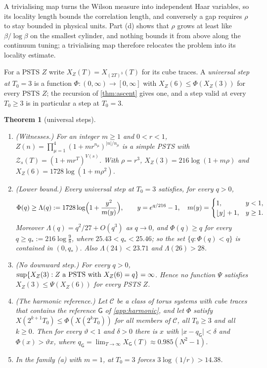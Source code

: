 \documentclass[11pt,a4paper]{amsart}
\newtheorem{theorem}{Theorem}[section]
\theoremstyle{definition}
\theoremstyle{remark}
\numberwithin{equation}{section}
\newcommand{\abs}[1]{\lvert #1\rvert}      %
\newcommand{\PSTS}{\textup{PSTS}}          %
\newcommand{\TT}{\mathbb{T}}               %
\newcommand{\Zc}{\mathcal{Z}}              %
\newcommand{\Zs}[2]{\Zc_{#1}(#2)}          %
\newcommand{\XT}[2]{X_{#1}(#2)}            %
\newcommand{\Vol}[1]{V(#1)}                %
\newcommand{\cube}[1]{(2#1)^3}             %
\newcommand{\Gharm}{\mathsf{G}}            %
\newcommand{\Bcirc}{\text{\upshape(B$^{\circ}$)}}   %
\begin{document}
A trivialising map turns the Wilson measure into independent Haar variables, so its locality length bounds the correlation length, and conversely a gap requires $\rho$ to stay bounded in physical units. Part (d) shows that $\rho$ grows at least like $\beta/\log\beta$ on the smallest cylinder, and nothing bounds it from above along the continuum tuning; a trivialising map therefore relocates the problem into its locality estimate.

For a \PSTS{} $Z$ write $X_Z(T)=\XT{\cube T}{T}$ for its cube traces. A \emph{universal step at $T_0=3$} is a function $\Phi\colon(0,\infty)\to[0,\infty]$ with $X_Z(6)\le\Phi(X_Z(3))$ for every \PSTS{} $Z$; the recursion of \cref{thm:ascent} gives one, and a step valid at every $T_0\ge3$ is in particular a step at $T_0=3$.

\begin{theorem}[universal steps]\label{thm:universal-step}
\begin{enumerate}[label=\textup{(\alph*)},leftmargin=*]
\item \textup{(Witnesses.)} For an integer $m\ge1$ and $0<r<1$, $Z(n)=\prod_{\mu=1}^4(1+mr^{n_\mu})^{\abs n/n_\mu}$ is a simple \PSTS{} with $\Zs sT=(1+mr^T)^{\Vol s}$. With $\rho=r^3$, $X_Z(3)=216\log(1+m\rho)$ and $X_Z(6)=1728\log(1+m\rho^2)$.
\item \textup{(Lower bound.)} Every universal step at $T_0=3$ satisfies, for every $q>0$,
\[
\Phi(q)\ge\Lambda(q):=1728\log\Bigl(1+\frac{y^2}{m(y)}\Bigr),\qquad y=e^{q/216}-1,\quad m(y)=\begin{cases}1,&y<1,\\\lfloor y\rfloor+1,&y\ge1.\end{cases}
\]
Moreover $\Lambda(q)=q^2/27+O(q^3)$ as $q\to0$, and $\Phi(q)\ge q$ for every $q\ge q_*:=216\log\frac98$, where $25.43<q_*<25.46$; so the set $\{q:\Phi(q)<q\}$ is contained in $(0,q_*)$. Also $\Lambda(24)<23.71$ and $\Lambda(26)>28$.
\item \textup{(No downward step.)} For every $q>0$, $\sup\{X_Z(3):Z\text{ a \PSTS{} with }X_Z(6)=q\}=\infty$. Hence no function $\Psi$ satisfies $X_Z(3)\le\Psi(X_Z(6))$ for every \PSTS{} $Z$.
\item \textup{(The harmonic reference.)} Let $\mathcal C$ be a class of torus systems with cube traces that contains the reference $\Gharm$ of \cref{app:harmonic}, and let $\Phi$ satisfy $X(2^{k+1}T_0)\le\Phi(X(2^kT_0))$ for all members of $\mathcal C$, all $T_0\ge3$ and all $k\ge0$. Then for every $\vartheta<1$ and $\delta>0$ there is $x$ with $\abs{x-q_\Gharm}<\delta$ and $\Phi(x)>\vartheta x$, where $q_\Gharm=\lim_{T\to\infty}X_\Gharm(T)\approx0.985(N^2-1)$.
\item In the family \textup{(a)} with $m=1$, \Bcirc{} at $T_0=3$ forces $3\log(1/r)>14.38$.
\end{enumerate}
\end{theorem}
\end{document}

